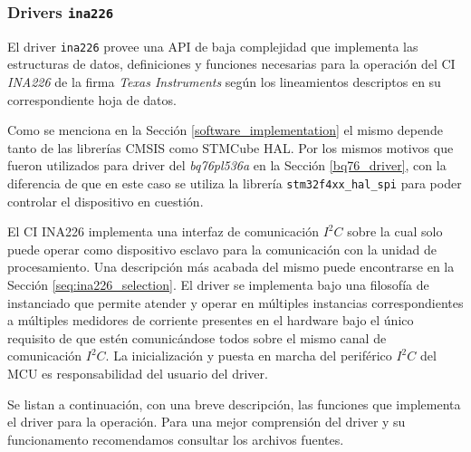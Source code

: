 \documentclass[10pt, a4paper]{report}
\begin{document}
\subsubsection{Drivers \texttt{ina226}}

El driver \texttt{ina226} provee una \acrshort{API} de baja complejidad que
implementa las estructuras de datos, definiciones y funciones necesarias para la
operación del \acrshort{CI} \emph{INA226} de la firma \emph{Texas
Instruments} según los lineamientos descriptos en su correspondiente hoja de
datos. 

Como se menciona en la Secci\'on \ref{software_implementation} el mismo
depende tanto de las librer\'ias \acrshort{CMSIS} como STMCube \acrshort{HAL}.
Por los mismos motivos que fueron utilizados para driver del \emph{bq76pl536a} 
en la Secci\'on \ref{bq76_driver}, con la diferencia de que en este caso se
utiliza la librer\'ia \texttt{stm32f4xx\_hal\_spi} para poder controlar el
dispositivo en cuesti\'on.

El \acrshort{CI} INA226 implementa una interfaz de comunicación $I^2C$ sobre la
cual solo puede operar como dispositivo esclavo para la comunicación con la
unidad de procesamiento. Una descripción más acabada del mismo puede
encontrarse en la Sección \ref{seq:ina226_selection}. El driver se implementa 
bajo una filosofía de instanciado que permite atender y operar en múltiples
instancias correspondientes a múltiples medidores de corriente presentes en el 
hardware bajo el único requisito de que estén comunicándose todos sobre el mismo 
canal de comunicación \emph{$I^2C$}. La inicialización y puesta en marcha del 
periférico \emph{$I^2C$} del \acrshort{MCU} es responsabilidad del usuario del 
driver.

Se listan a continuación, con una breve descripción, las funciones que
implementa el driver para la operación. Para una mejor comprensión del driver y
su funcionamento recomendamos consultar los archivos fuentes.
\end{document}
